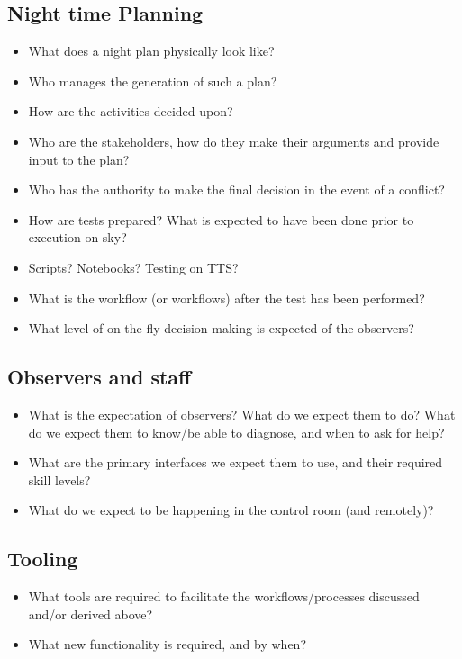 \documentclass[SE,authoryear,toc]{lsstdoc}
\begin{document}
\subsection{Night time Planning}
\begin{itemize}
\item What does a night plan physically look like?
\item Who manages the generation of such a plan?
\item How are the activities decided upon?
\item Who are the stakeholders, how do they make their arguments and provide input to the plan?
\item Who has the authority to make the final decision in the event of a conflict?
\item How are tests prepared? What is expected to have been done prior to execution on-sky?
\item Scripts? Notebooks? Testing on TTS?
\item What is the workflow (or workflows) after the test has been performed?
\item What level of on-the-fly decision making is expected of the observers?
\end{itemize}


\subsection{Observers and staff}
\begin{itemize}
\item What is the expectation of observers? What do we expect them to do? 
      What do we expect them to know/be able to diagnose, and when to ask for help?
\item What are the primary interfaces we expect them to use, and their required skill levels?
\item What do we expect to be happening in the control room (and remotely)?
\end{itemize}

\subsection{Tooling}
\begin{itemize}
\item What tools are required to facilitate the workflows/processes discussed and/or derived above?
\item What new functionality is required, and by when?
\end{itemize}
\end{document}
